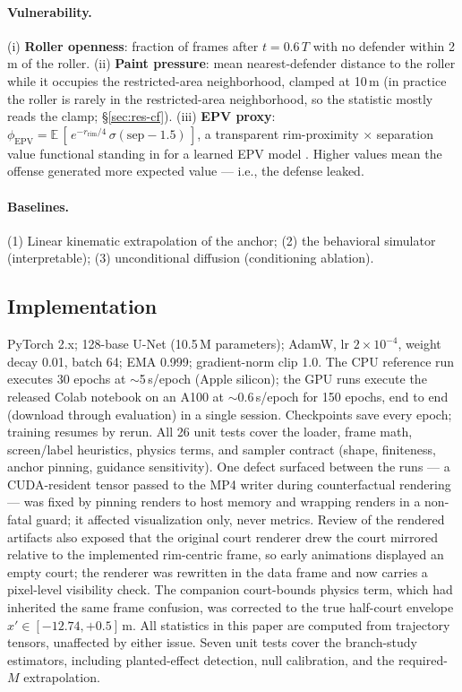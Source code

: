 \documentclass[11pt]{article}
\newcommand{\E}{\mathbb{E}}
\begin{document}
\paragraph{Vulnerability.}
\label{sec:vulnerability}
(i) \textbf{Roller openness}: fraction of frames after $t = 0.6\,T$ with no
defender within 2\,m of the roller. (ii) \textbf{Paint pressure}: mean
nearest-defender distance to the roller while it occupies the restricted-area
neighborhood, clamped at 10\,m (in practice the roller is rarely in the
restricted-area neighborhood, so the statistic mostly reads the clamp;
\S\ref{sec:res-cf}). (iii) \textbf{EPV proxy}:
$\phi_{\text{EPV}} = \E\,[\,e^{-r_{\text{rim}}/4}\,
\sigma(\text{sep} - 1.5)\,]$, a transparent rim-proximity $\times$ separation
value functional standing in for a learned EPV model
\citep{yamamoto2022epv}. Higher values mean the offense generated more
expected value --- i.e., the defense leaked.

\paragraph{Baselines.}
(1) Linear kinematic extrapolation of the anchor; (2) the behavioral
simulator (interpretable); (3) unconditional diffusion (conditioning
ablation).

\subsection{Implementation}
\label{sec:impl}

PyTorch 2.x; 128-base U-Net (10.5\,M parameters); AdamW, lr $2\times10^{-4}$,
weight decay 0.01, batch 64; EMA 0.999; gradient-norm clip 1.0. The CPU
reference run executes 30 epochs at $\sim$5\,s/epoch (Apple silicon); the GPU
runs execute the released Colab notebook on an A100 at $\sim$0.6\,s/epoch for
150 epochs, end to end (download through evaluation) in a single session.
Checkpoints save every epoch; training resumes by rerun. All 26 unit tests
cover the loader, frame math, screen/label heuristics, physics terms, and
sampler contract (shape, finiteness, anchor pinning, guidance sensitivity).
One defect surfaced between the runs --- a CUDA-resident tensor passed to the
MP4 writer during counterfactual rendering --- was fixed by pinning renders
to host memory and wrapping renders in a non-fatal guard; it affected
visualization only, never metrics. Review of the rendered artifacts also
exposed that the original court renderer drew the court mirrored relative to
the implemented rim-centric frame, so early animations displayed an empty
court; the renderer was rewritten in the data frame and now carries a
pixel-level visibility check. The companion court-bounds physics term, which
had inherited the same frame confusion, was corrected to the true half-court
envelope $x' \in [-12.74, +0.5]$\,m. All statistics in this paper are computed
from trajectory tensors, unaffected by either issue. Seven unit tests cover
the branch-study estimators, including planted-effect detection, null
calibration, and the required-$M$ extrapolation.
\end{document}
